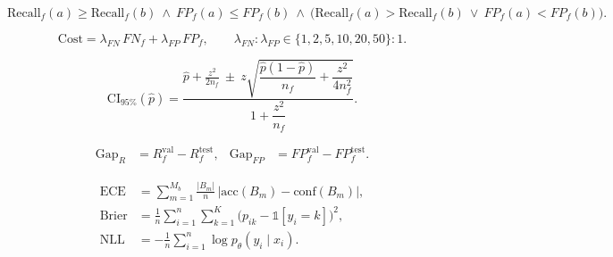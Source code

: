 \begin{equation}\label{eq:pareto}
  \mathrm{Recall}_f(a)\ge \mathrm{Recall}_f(b)\ \wedge\ FP_f(a)\le FP_f(b)
  \ \wedge\ \big(\mathrm{Recall}_f(a)>\mathrm{Recall}_f(b)\ \vee\ FP_f(a)<FP_f(b)\big).
\end{equation}

\begin{equation}\label{eq:cost}
  \mathrm{Cost} = \lambda_{FN}\,FN_f + \lambda_{FP}\,FP_f,
  \qquad \lambda_{FN}:\lambda_{FP}\in\{1,2,5,10,20,50\}:1 .
\end{equation}

\begin{equation}\label{eq:wilson}
  \mathrm{CI}_{95\%}(\hat{p}) =
  \frac{\hat{p}+\frac{z^2}{2n_f}\ \pm\ z\sqrt{\dfrac{\hat{p}(1-\hat{p})}{n_f}+\dfrac{z^2}{4n_f^2}}}{1+\dfrac{z^2}{n_f}} .
\end{equation}

\begin{align}
  \mathrm{Gap}_R &= R_f^{\mathrm{val}} - R_f^{\mathrm{test}}, &
  \mathrm{Gap}_{FP} &= FP_f^{\mathrm{val}} - FP_f^{\mathrm{test}}. \label{eq:valtest-gap}
\end{align}

\begin{align}
  \mathrm{ECE} &= \sum_{m=1}^{M_b}\frac{\lvert B_m\rvert}{n}\,\big\lvert \mathrm{acc}(B_m)-\mathrm{conf}(B_m)\big\rvert, \label{eq:ece}\\
  \mathrm{Brier} &= \frac{1}{n}\sum_{i=1}^{n}\sum_{k=1}^{K}\big(p_{ik}-\mathbb{1}[y_i=k]\big)^2, \label{eq:brier}\\
  \mathrm{NLL} &= -\frac{1}{n}\sum_{i=1}^{n}\log p_\theta(y_i\mid x_i). \label{eq:nll}
\end{align}

